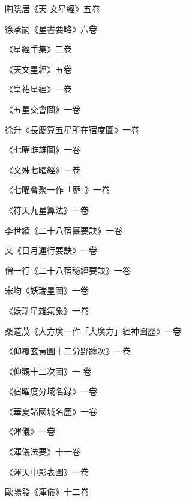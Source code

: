 \begin{pinyinscope}
 陶隱居《天
 文星經》五卷



 徐承嗣《星書要略》六卷



 《星經手集》二卷



 《天文星經》五卷



 《皇祐星經》一卷



 《五星交會圖》一卷



 徐升《長慶算五星所在宿度圖》一卷



 《七曜雌雄圖》一卷



 《文殊七曜經》一卷



 《七曜會聚一作「歷」》一卷



 《符天九星算法》一卷



 李世績《二十八宿纂要訣》一卷



 又《日月運行要訣》一卷



 僧一行《二十八宿秘經要訣》一卷



 宋均《妖瑞星圖》一卷



 《妖瑞星雜氣象》一卷



 桑道茂《大方廣一作「大廣方」經神圖歷》一卷



 《仰覆玄黃圖十二分野躔次》一卷



 《仰觀十二次圖》一
 卷



 《宿曜度分域名錄》一卷



 《華夏諸國城名歷》一卷



 《渾儀》一卷



 《渾儀法要》十一卷



 《渾天中影表圖》一卷



 歐陽發《渾儀》十二卷




\end{pinyinscope}
